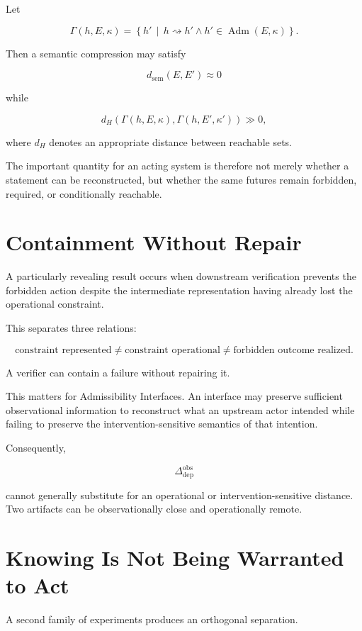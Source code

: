 \documentclass[11pt]{article}
\newcommand{\Adm}{\operatorname{Adm}}
\begin{document}
Let

\[ \Gamma(h,E,\kappa)
=
\left\{ h' \,\middle|\, h\rightsquigarrow h' \land h'\in\Adm(E,\kappa) \right\}. \]

Then a semantic compression may satisfy

\[ d_{\mathrm{sem}}(E,E')\approx 0\]

while

\[ d_H\!\left( \Gamma(h,E,\kappa), \Gamma(h,E',\kappa') \right) \gg 0,\]

where $d_H$ denotes an appropriate distance between reachable sets.

The important quantity for an acting system is therefore not merely whether a statement can be reconstructed, but whether the same futures remain forbidden, required, or conditionally reachable.

\section{Containment Without Repair}

A particularly revealing result occurs when downstream verification prevents the forbidden action despite the intermediate representation having already lost the operational constraint.

This separates three relations:

\[ \boxed{ \text{constraint represented} \neq \text{constraint operational} \neq \text{forbidden outcome realized}. }\]

A verifier can contain a failure without repairing it.

This matters for Admissibility Interfaces. An interface may preserve sufficient observational information to reconstruct what an upstream actor intended while failing to preserve the intervention-sensitive semantics of that intention.

Consequently,

\[ \Delta_{\mathrm{dep}}^{\mathrm{obs}}\]

cannot generally substitute for an operational or intervention-sensitive distance. Two artifacts can be observationally close and operationally remote.

\section{Knowing Is Not Being Warranted to Act}

A second family of experiments produces an orthogonal separation.
\end{document}
